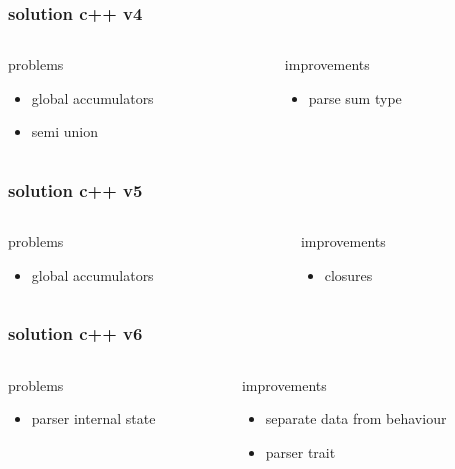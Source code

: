 \begin{frame}
    \frametitle{solution c++ v4}
    \begin{columns}
        \begin{column}{.48\textwidth}
            problems
            \begin{itemize}
                \item global accumulators
                \item semi union
            \end{itemize}
        \end{column}
        \begin{column}{.48\textwidth}
            improvements
            \begin{itemize}
                \item parse sum type
            \end{itemize}
        \end{column}
    \end{columns}
\end{frame}

\begin{frame}
    \frametitle{solution c++ v5}
    \begin{columns}
        \begin{column}{.48\textwidth}
            problems
            \begin{itemize}
                \item global accumulators
            \end{itemize}
        \end{column}
        \begin{column}{.48\textwidth}
            improvements
            \begin{itemize}
                \item closures
            \end{itemize}
        \end{column}
    \end{columns}
\end{frame}

\begin{frame}
    \frametitle{solution c++ v6}
    \begin{columns}
        \begin{column}{.48\textwidth}
            problems
            \begin{itemize}
                \item parser internal state
            \end{itemize}
        \end{column}
        \begin{column}{.48\textwidth}
            improvements
            \begin{itemize}
                \item separate data from behaviour
                \item parser trait
            \end{itemize}
        \end{column}
    \end{columns}
\end{frame}

